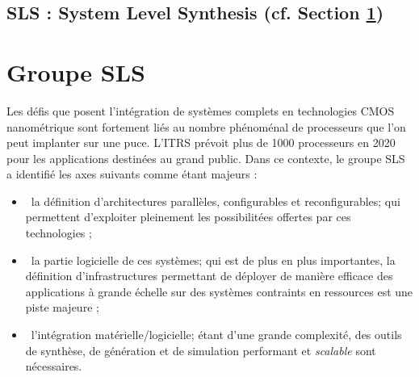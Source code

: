 \subsection[SLS]{SLS : System Level Synthesis (cf. Section \ref{sec:sls})} 

\section{Groupe SLS}
\label{sec:sls}
Les défis que posent l'intégration de systèmes complets en technologies CMOS nanométrique sont fortement liés au nombre phénoménal de processeurs que l'on peut implanter sur une puce. L'ITRS prévoit plus de 1000 processeurs en 2020 pour les applications destinées au grand public. Dans ce contexte, le groupe SLS a identifié les axes suivants comme étant majeurs :
\begin{itemize}
\item\ la définition d'architectures parallèles, configurables et reconfigurables; qui permettent d'exploiter pleinement les possibilitées offertes par ces technologies ;
\item\ la partie logicielle de ces systèmes; qui est de plus en plus importantes, la définition d'infrastructures permettant de déployer de manière efficace des applications à grande échelle sur des systèmes contraints en ressources est une piste majeure ;
\item\ l'intégration matérielle/logicielle; étant d'une grande complexité, des outils de synthèse, de génération et de simulation performant et \textit{scalable} sont nécessaires.
\end{itemize}
